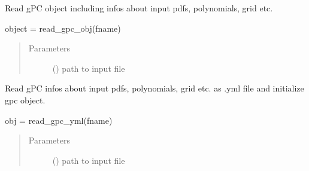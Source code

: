 \documentclass[letterpaper,10pt,english,openany,oneside]{sphinxmanual}
\begin{document}

\begin{fulllineitems}
\label{\detokenize{pygpc:pygpc.rw.read_gpc_pkl}}
Read gPC object including infos about input pdfs, polynomials, grid etc.

object = read\_gpc\_obj(fname)
\begin{quote}\begin{description}
\item[{Parameters}] \leavevmode
{} () \textendash{} path to input file

\end{description}\end{quote}

\end{fulllineitems}


\begin{fulllineitems}
\label{\detokenize{pygpc:pygpc.rw.read_gpc_yml}}
Read gPC infos about input pdfs, polynomials, grid etc. as .yml file and initialize gpc object.

obj = read\_gpc\_yml(fname)
\begin{quote}\begin{description}
\item[{Parameters}] \leavevmode
{} () \textendash{} path to input file

\end{description}\end{quote}

\end{fulllineitems}

\end{document}

